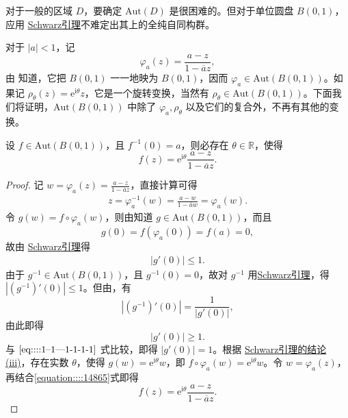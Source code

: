 \documentclass[../../main.tex]{subfiles}%
\begin{document}
对于一般的区域 \( D \)，要确定 \( \text{Aut}(D) \) 是很困难的。但对于单位圆盘 \( B(0,1) \)，应用 \hyperref[theorem:Schwarz引理-定理4.5.3]{Schwarz引理}不难定出其上的全纯自同构群。

对于 \( |a| < 1 \)，记
\[
\varphi_a(z) = \frac{a - z}{1 - \overline{a} z},
\]
由 知道，它把 \( B(0,1) \) 一一地映为 \( B(0,1) \)，因而 \( \varphi_a \in \text{Aut}(B(0,1)) \)。如果记 \( \rho_\theta(z) = \mathrm{e}^{\mathrm{i}\theta} z \)，它是一个旋转变换，当然有 \( \rho_\theta \in \text{Aut}(B(0,1)) \)。下面我们将证明，\( \text{Aut}(B(0,1)) \) 中除了 \( \varphi_a, \rho_\theta \) 以及它们的复合外，不再有其他的变换。

\begin{theorem}\label{theorem:定理4.5.5}
设 \( f \in \text{Aut}(B(0,1)) \)，且 \( f^{-1}(0) = a \)，则必存在 \( \theta \in \mathbb{R} \)，使得
\[
f(z) = \mathrm{e}^{\mathrm{i}\theta} \frac{a - z}{1 - \overline{a} z}.
\]
\end{theorem}
\begin{proof}
记 \( w = \varphi_a(z)= \frac{a - z}{1 - \overline{a} z} \)，直接计算可得
\begin{align}\label{equation::::14865}
z = \varphi_a^{-1}(w) = \frac{a - w}{1 - \overline{a} w} = \varphi_a(w).
\end{align}
令 \( g(w) = f \circ \varphi_a(w) \)，则由知道 \( g \in \text{Aut}(B(0,1)) \)，而且
\[
g(0) = f(\varphi_a(0)) = f(a) = 0,
\]
故由 \hyperref[theorem:Schwarz引理-定理4.5.3]{Schwarz引理}得
\begin{align}
|g'(0)| \leqslant  1.\label{eq::::1--1---1-1-1-1}
\end{align}
由于 \( g^{-1} \in \text{Aut}(B(0,1)) \)，且 \( g^{-1}(0) = 0 \)，故对 \( g^{-1} \) 用\hyperref[theorem:Schwarz引理-定理4.5.3]{Schwarz引理}，得 \( |(g^{-1})'(0)| \leqslant  1 \)。但由，有
\[
|(g^{-1})'(0)| = \frac{1}{|g'(0)|},
\]
由此即得
\[
|g'(0)| \geqslant  1.
\]
与 \(\eqref{eq::::1--1---1-1-1-1}\) 式比较，即得 \( |g'(0)| = 1 \)。根据 \hyperref[theorem:Schwarz引理-定理4.5.3]{Schwarz引理的结论(iii)}，存在实数 \( \theta \)，使得 \( g(w) = \mathrm{e}^{\mathrm{i}\theta} w \)，即 \( f \circ \varphi_a(w) = \mathrm{e}^{\mathrm{i}\theta} w \)。令 \( w = \varphi_a(z) \)，再结合\eqref{equation::::14865}式即得
\[
f(z) = \mathrm{e}^{\mathrm{i}\theta} \frac{a - z}{1 - \overline{a} z}.
\] 
\end{proof}
\end{document}
